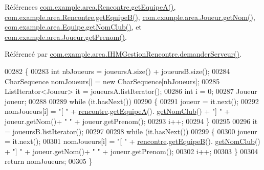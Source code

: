 Références \hyperlink{_rencontre_8java_source_l00177}{com.\+example.\+area.\+Rencontre.\+get\+Equipe\+A()}, \hyperlink{_rencontre_8java_source_l00186}{com.\+example.\+area.\+Rencontre.\+get\+Equipe\+B()}, \hyperlink{_joueur_8java_source_l00039}{com.\+example.\+area.\+Joueur.\+get\+Nom()}, \hyperlink{_equipe_8java_source_l00043}{com.\+example.\+area.\+Equipe.\+get\+Nom\+Club()}, et \hyperlink{_joueur_8java_source_l00047}{com.\+example.\+area.\+Joueur.\+get\+Prenom()}.



Référencé par \hyperlink{_i_h_m_gestion_rencontre_8java_source_l00222}{com.\+example.\+area.\+I\+H\+M\+Gestion\+Rencontre.\+demander\+Serveur()}.


\begin{DoxyCode}
00282     \{
00283         \textcolor{keywordtype}{int} nbJoueurs = joueursA.size() + joueursB.size();
00284         CharSequence nomJoueurs[] = \textcolor{keyword}{new} CharSequence[nbJoueurs];
00285         ListIterator<Joueur> it = joueursA.listIterator();
00286         \textcolor{keywordtype}{int} i = 0;
00287         Joueur joueur;
00288 
00289         \textcolor{keywordflow}{while} (it.hasNext())
00290         \{
00291             joueur = it.next();
00292             nomJoueurs[i] = \textcolor{stringliteral}{"[ "} + \hyperlink{classcom_1_1example_1_1area_1_1_i_h_m_gestion_rencontre_aa3ecacbd8ab104d2a3c3f3e727ae6c5c}{rencontre}.\hyperlink{classcom_1_1example_1_1area_1_1_rencontre_a207498fd691285b28b0a720da0a660f8}{getEquipeA}().
      \hyperlink{classcom_1_1example_1_1area_1_1_equipe_a735e5e0aaac9ac2c17f3eca3d47862dc}{getNomClub}() + \textcolor{stringliteral}{"] "} + joueur.getNom()+ \textcolor{stringliteral}{" "} + joueur.getPrenom();
00293             i++;
00294         \}
00295 
00296         it = joueursB.listIterator();
00297 
00298         \textcolor{keywordflow}{while} (it.hasNext())
00299         \{
00300             joueur = it.next();
00301             nomJoueurs[i] = \textcolor{stringliteral}{"[ "} + \hyperlink{classcom_1_1example_1_1area_1_1_i_h_m_gestion_rencontre_aa3ecacbd8ab104d2a3c3f3e727ae6c5c}{rencontre}.\hyperlink{classcom_1_1example_1_1area_1_1_rencontre_a83deec026e26407049c5671672291170}{getEquipeB}().
      \hyperlink{classcom_1_1example_1_1area_1_1_equipe_a735e5e0aaac9ac2c17f3eca3d47862dc}{getNomClub}() + \textcolor{stringliteral}{"] "} + joueur.getNom()+ \textcolor{stringliteral}{" "} + joueur.getPrenom();
00302             i++;
00303         \}
00304         \textcolor{keywordflow}{return} nomJoueurs;
00305     \}
\end{DoxyCode}
\mbox{\label{classcom_1_1example_1_1area_1_1_i_h_m_gestion_rencontre_ac3d024fe8637e7cc4469a88a7ab81b53}} 

